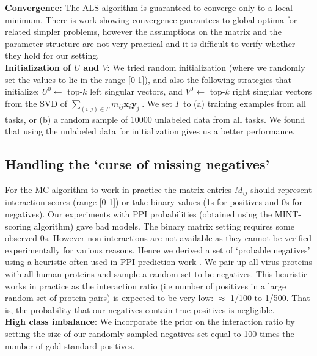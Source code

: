 \documentclass{bioinfo}
\begin{document}
\noindent \textbf{Convergence:} The ALS algorithm is guaranteed to converge only to a local minimum. There is work showing convergence guarantees to global optima for related simpler problems, however the assumptions on the matrix and the parameter structure are not very practical and 
it is difficult to verify whether they hold for our setting. \\
\noindent \textbf{Initialization of $U$ and $V$}: We tried random initialization (where we randomly set the values to lie in the range [0 1]), and also 
the following strategies that initialize: $U^0 \leftarrow$ top-$k$ left singular vectors, and $V^0 \leftarrow$ top-$k$ right singular vectors from 
the SVD of $\displaystyle{\sum_{(i,j) \in \Gamma}} m_{ij} \mathbf{x}_i \mathbf{y}_j^\intercal$. We set $\Gamma$ to 
(a) training examples from all tasks, or (b) a random sample of 10000 unlabeled data from all tasks. We found that using the unlabeled data for initialization gives us a better performance.




\subsection{Handling the `curse of missing negatives'}
\label{negs}
For the MC algorithm to work in practice the matrix entries $M_{ij}$ should represent interaction scores (range [0 1]) 
or take binary values (1s for positives and 0s for negatives). Our experiments with PPI probabilities (obtained using the MINT-scoring algorithm)
gave bad models. The binary matrix setting requires some observed 0s. However non-interactions are not available as they cannot be verified 
experimentally for various reasons. Hence we derived a set of `probable negatives' using a heuristic often used in PPI prediction 
work \citep{qi06,qi09,dyer11,me_ismb_2013}. We pair up all virus proteins with all human proteins and sample a random set to be negatives. 
This heuristic works in practice as the interaction ratio (i.e number of positives in a large random set of protein pairs) is expected to be very low:
$\approx$ 1/100 to 1/500. That is, the probability that our negatives contain true positives is negligible. \\
\textbf{High class imbalance}: We incorporate the prior on the interaction ratio by setting the size of our randomly sampled negatives set equal to
100 times the number of gold standard positives.
\end{document}
